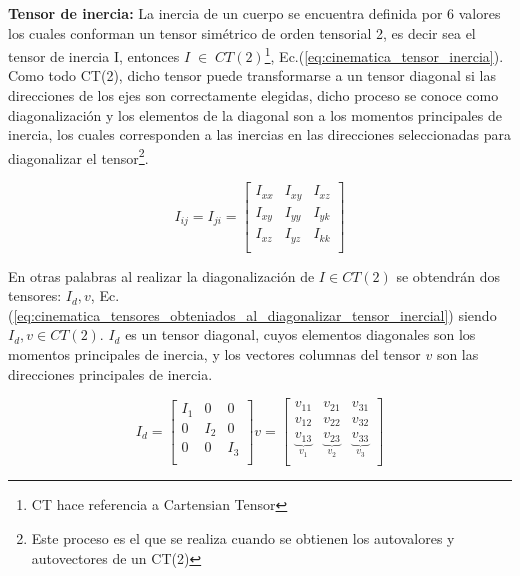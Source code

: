 \documentclass[oneside,a4paper,english,links]{amca}
\begin{document}
\textbf{Tensor de inercia:} La inercia de un cuerpo se encuentra definida por 6 valores los cuales conforman un tensor sim\'etrico de orden tensorial 2, es decir sea el tensor de inercia I, entonces $I\;\in\;CT(2)$\footnote{CT hace referencia a Cartensian Tensor}, Ec.(\ref{eq:cinematica_tensor_inercia}). Como todo CT(2), dicho tensor puede transformarse a un tensor diagonal si las direcciones de los ejes son correctamente elegidas, dicho proceso se conoce como diagonalizaci\'on y los elementos de la diagonal son a los momentos principales de inercia, los cuales corresponden a las inercias en las direcciones seleccionadas para diagonalizar el tensor\footnote{Este proceso es el que se realiza cuando se obtienen los autovalores y autovectores de un CT(2)}.

\begin{equation}
    I_{ij} = I_{ji}=
    \begin{bmatrix}
    I_{xx} & I_{xy} & I_{xz}\\ 
    I_{xy} & I_{yy} & I_{yk}\\
    I_{xz} & I_{yz} & I_{kk}\\
    \end{bmatrix}
    \label{eq:cinematica_tensor_inercia}
\end{equation}

En otras palabras al realizar la diagonalizaci\'on de $I\in CT(2)$ se obtendr\'an dos tensores: $I_d, v$, Ec.(\ref{eq:cinematica_tensores_obteniados_al_diagonalizar_tensor_inercial}) siendo $I_d,v\in CT(2)$. $I_d$ es un tensor diagonal, cuyos elementos diagonales son los momentos principales de inercia, y los vectores columnas del tensor $v$ son las direcciones principales de inercia.

\begin{equation}
    I_d =
    \begin{bmatrix}
    I_1 & 0 & 0\\ 
    0 & I_{2} & 0\\
    0 & 0 & I_{3}\\
    \end{bmatrix}
    v =
    \begin{bmatrix}
   v_{11} & v_{21} & v_{31}\\ 
    v_{12} & v_{22} & v_{32}\\ 
    \underbrace{v_{13}}_{v_1} & \underbrace{v_{23}}_{v_2} & \underbrace{v_{33}}_{v_3}\\ 
    \end{bmatrix}
    \label{eq:cinematica_tensores_obteniados_al_diagonalizar_tensor_inercial}
\end{equation}
\end{document}

